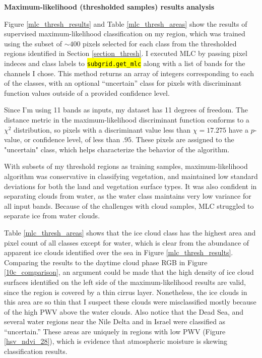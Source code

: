 \documentclass[12pt]{article}
\newcommand{\hltexttt}[1]{\texttt{\hl{#1}}}
\begin{document}
\noindent
\textbf{Maximum-likelihood (thresholded samples) results analysis}

Figure \ref{mlc_thresh_results} and Table \ref{mlc_thresh_areas} show the results of supervised maximum-likelihood classification on my region, which was trained using the subset of $\sim 400$ pixels selected for each class from the thresholded regions identified in Section \ref{section_thresh}. I executed MLC by passing pixel indeces and class labels to \hltexttt{subgrid.get\_mlc} along with a list of bands for the channels I chose. This method returns an array of integers corresponding to each of the classes, with an optional ``uncertain'' class for pixels with discriminant function values outside of a provided confidence level.

Since I'm using 11 bands as inputs, my dataset has 11 degrees of freedom. The distance metric in the maximum-likelihood discriminant function conforms to a $\chi^2$ distribution, so pixels with a discriminant value less than $\chi = 17.275$ have a $p$-value, or confidence level, of less than $.95$. These pixels are assigned to the "uncertain" class, which helps characterize the behavior of the algorithm.

With subsets of my threshold regions as training samples, maximum-likelihood algorithm was conservative in classifying vegetation, and maintained low standard deviations for both the land and vegetation surface types. It was also confident in separating clouds from water, as the water class maintains very low variance for all input bands. Because of the challenges with cloud samples, MLC struggled to separate ice from water clouds.

Table \ref{mlc_thresh_areas} shows that the ice cloud class has the highest area and pixel count of all classes except for water, which is clear from the abundance of apparent ice clouds identified over the sea in Figure \ref{mlc_thresh_results}. Comparing the results to the daytime cloud phase RGB in Figure \ref{10c_comparison}, an argument could be made that the high density of ice cloud surfaces identified on the left side of the maximum-likelihood results are valid, since the region is covered by a thin cirrus layer. Nonetheless, the ice clouds in this area are so thin that I suspect these clouds were misclassified mostly because of the high PWV above the water clouds. Also notice that the Dead Sea, and several water regions near the Nile Delta and in Israel were classified as ``uncertain.'' These areas are uniquely in regions with low PWV (Figure \ref{hsv_ndvi_28}), which is evidence that atmospheric moisture is skewing classification results.
\end{document}
